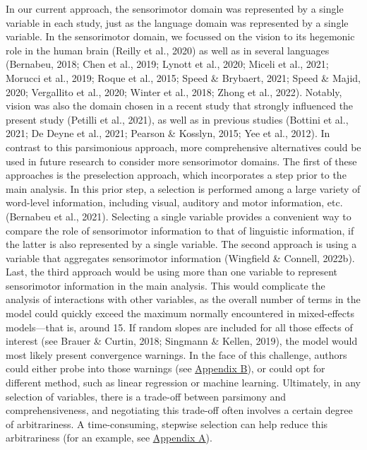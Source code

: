 \documentclass[
  12pt,
  man,floatsintext]{apa7}
\begin{document}
In our current approach, the sensorimotor domain was represented by a single variable in each study, just as the language domain was represented by a single variable. In the sensorimotor domain, we focussed on the vision to its hegemonic role in the human brain (Reilly et al., 2020) as well as in several languages (Bernabeu, 2018; Chen et al., 2019; Lynott et al., 2020; Miceli et al., 2021; Morucci et al., 2019; Roque et al., 2015; Speed \& Brybaert, 2021; Speed \& Majid, 2020; Vergallito et al., 2020; Winter et al., 2018; Zhong et al., 2022). Notably, vision was also the domain chosen in a recent study that strongly influenced the present study (Petilli et al., 2021), as well as in previous studies (Bottini et al., 2021; De Deyne et al., 2021; Pearson \& Kosslyn, 2015; Yee et al., 2012). In contrast to this parsimonious approach, more comprehensive alternatives could be used in future research to consider more sensorimotor domains. The first of these approaches is the preselection approach, which incorporates a step prior to the main analysis. In this prior step, a selection is performed among a large variety of word-level information, including visual, auditory and motor information, etc. (Bernabeu et al., 2021). Selecting a single variable provides a convenient way to compare the role of sensorimotor information to that of linguistic information, if the latter is also represented by a single variable. The second approach is using a variable that aggregates sensorimotor information (Wingfield \& Connell, 2022b). Last, the third approach would be using more than one variable to represent sensorimotor information in the main analysis. This would complicate the analysis of interactions with other variables, as the overall number of terms in the model could quickly exceed the maximum normally encountered in mixed-effects models---that is, around 15. If random slopes are included for all those effects of interest (see Brauer \& Curtin, 2018; Singmann \& Kellen, 2019), the model would most likely present convergence warnings. In the face of this challenge, authors could either probe into those warnings (see \protect\hyperlink{appendix-B-frequentist-analysis-diagnostics}{\underline{Appendix B}}), or could opt for different method, such as linear regression or machine learning. Ultimately, in any selection of variables, there is a trade-off between parsimony and comprehensiveness, and negotiating this trade-off often involves a certain degree of arbitrariness. A time-consuming, stepwise selection can help reduce this arbitrariness (for an example, see \protect\hyperlink{appendix-A-lexical-covariates}{\underline{Appendix A}}).
\end{document}
